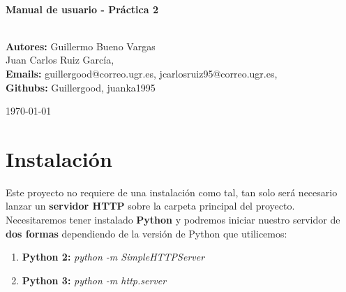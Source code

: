 \documentclass[12zpt]{article}
\begin{document}
\begin{center}
 			\vspace*{1cm}																		%
\HRule \\[0.4cm]																	%
{ \huge \bfseries Manual de usuario - Práctica 2}\\[0.4cm]	%
\HRule \\[1.5cm]																	%
\begin{minipage}{0.46\textwidth}													%
\begin{center} \large															%
\textbf{Autores:} Guillermo Bueno Vargas\\
Juan Carlos Ruiz García,\\
\textbf{Emails:} guillergood@correo.ugr.es, jcarlosruiz95@correo.ugr.es,\\
\textbf{Githubs:} Guillergood, juanka1995\\ 
\end{center}																		%
\end{minipage}		
\vspace{7cm} 																				
\begin{center}																					
{\large \today}																	%
 			\end{center}												  						
\end{center}							 											
																					
\newpage																		


\tableofcontents

\newpage

\section{Instalación}
Este proyecto no requiere de una instalación como tal, tan solo será necesario lanzar un \textbf{servidor HTTP} sobre la carpeta principal del proyecto.
Necesitaremos tener instalado \textbf{Python} y podremos iniciar nuestro servidor de \textbf{dos formas} dependiendo de la versión de Python que utilicemos:

\begin{enumerate}
	\item \textbf{Python 2:} \textit{python ­-m SimpleHTTPServer} 
	\item \textbf{Python 3:} \textit{python ­-m http.server} 
\end{enumerate}
\end{document}
